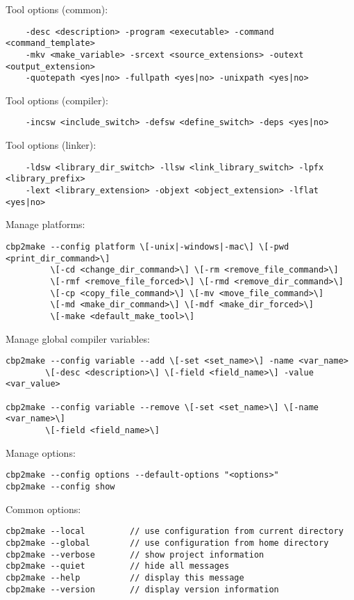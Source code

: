 Tool options (common):
\begin{verbatim}
    -desc <description> -program <executable> -command <command_template>
    -mkv <make_variable> -srcext <source_extensions> -outext <output_extension>
    -quotepath <yes|no> -fullpath <yes|no> -unixpath <yes|no>
\end{verbatim}

Tool options (compiler):
\begin{verbatim}
    -incsw <include_switch> -defsw <define_switch> -deps <yes|no>
\end{verbatim}

Tool options (linker):
\begin{verbatim}
    -ldsw <library_dir_switch> -llsw <link_library_switch> -lpfx <library_prefix>
    -lext <library_extension> -objext <object_extension> -lflat <yes|no>
\end{verbatim}

Manage platforms:
\begin{verbatim}
cbp2make --config platform \[-unix|-windows|-mac\] \[-pwd <print_dir_command>\]
         \[-cd <change_dir_command>\] \[-rm <remove_file_command>\]
         \[-rmf <remove_file_forced>\] \[-rmd <remove_dir_command>\]
         \[-cp <copy_file_command>\] \[-mv <move_file_command>\]
         \[-md <make_dir_command>\] \[-mdf <make_dir_forced>\]
         \[-make <default_make_tool>\]         
\end{verbatim}

\begin{samepage}
Manage global compiler variables:
\begin{verbatim}
cbp2make --config variable --add \[-set <set_name>\] -name <var_name>
        \[-desc <description>\] \[-field <field_name>\] -value <var_value>
        
cbp2make --config variable --remove \[-set <set_name>\] \[-name <var_name>\]
        \[-field <field_name>\]
\end{verbatim}
\end{samepage}

Manage options:
\begin{verbatim}
cbp2make --config options --default-options "<options>"    
cbp2make --config show
\end{verbatim}

Common options:
\begin{verbatim}
cbp2make --local         // use configuration from current directory
cbp2make --global        // use configuration from home directory
cbp2make --verbose       // show project information
cbp2make --quiet         // hide all messages
cbp2make --help          // display this message
cbp2make --version       // display version information
\end{verbatim}


